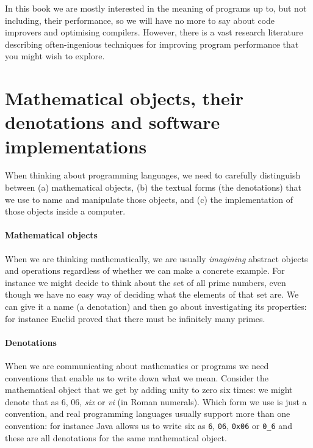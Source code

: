 In this book we are mostly interested in the meaning of programs up to, but not including, their performance, so we will have no more to say about code improvers and optimising compilers. However, there is a vast research literature describing often-ingenious techniques for improving program performance that you might wish to explore.

\section{Mathematical objects, their denotations and software implementations}
When thinking about programming languages, we need to carefully distinguish between (a) mathematical objects, (b) the textual forms (the denotations) that we use to name and manipulate those objects, and (c) the implementation of those objects inside a computer. 

\paragraph{Mathematical objects} When we are thinking mathematically, we are usually {\em imagining} abstract objects and operations regardless of whether we can make a concrete example. For instance we might decide to think about the set of all prime numbers, even though we have no easy way of deciding what the elements of that set are. We can give it a name (a denotation) and then go about investigating its properties: for instance Euclid proved that there must be infinitely many primes.

\paragraph{Denotations} When we are communicating about mathematics or programs we need conventions that enable us to write down what we mean. Consider the mathematical object that we get by adding unity to zero six times: we might denote that as $6$, $06$, {\em six} or {\em vi} (in Roman numerals). Which form we use is just a convention, and real programming languages usually support more than one convention: for instance Java allows us to write six as {\tt 6}, {\tt 06}, {\tt 0x06} or {\tt 0\_6} and these are all denotations for the same mathematical object.

